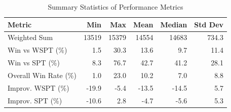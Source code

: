 \begin{table}[htbp]%
\centering%
\begin{tabular}{lrrrrr}%
\toprule%
\textbf{Metric}&\textbf{Min}&\textbf{Max}&\textbf{Mean}&\textbf{Median}&\textbf{Std Dev}\\%
\midrule%
Weighted Sum&13519&15379&14554&14683&734.3\\%
Win vs WSPT (\%)&1.5&30.3&13.6&9.7&11.4\\%
Win vs SPT (\%)&8.3&76.7&42.7&41.2&28.1\\%
Overall Win Rate (\%)&1.0&23.0&10.2&7.0&8.8\\%
Improv. WSPT (\%)&-19.9&-5.4&-13.5&-14.5&5.7\\%
Improv. SPT (\%)&-10.6&2.8&-4.7&-5.6&5.3\\%
\bottomrule%
\end{tabular}%
\caption{Summary Statistics of Performance Metrics}%
\label{tab:metrics}%
\end{table}